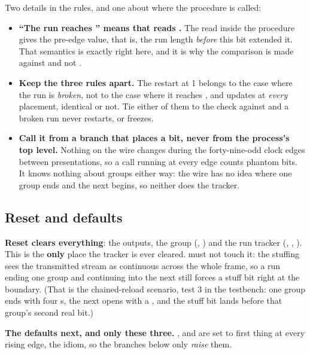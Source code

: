 Two details in the rules, and one about where the procedure is called:
\begin{itemize}
  \item \textbf{``The run reaches '' means that  reads
    .} The read inside the procedure gives the pre-edge value, that is, the run
    length \emph{before} this bit extended it. That semantics is exactly right here, and it is why
    the comparison is made against  and not .
  \item \textbf{Keep the three rules apart.} The restart at 1 belongs to the case where the run is
    \emph{broken}, not to the case where it reaches , and  updates at
    \emph{every} placement, identical or not. Tie either of them to the check against 
    and a broken run never restarts, or  freezes.
  \item \textbf{Call it from a branch that places a bit, never from the process's top level.} Nothing
    on the wire changes during the forty-nine-odd clock edges between presentations, so a call
    running at every edge counts phantom bits. It knows nothing about groups either way: the wire has
    no idea where one group ends and the next begins, so neither does the tracker.
\end{itemize}

\subsection{Reset and defaults}
\label{c14:sub:defaults}

\textbf{Reset clears everything}: the outputs, the group (, ) and the
run tracker (, , ). This is the \textbf{only}
place the tracker is ever cleared.  must not touch it: the stuffing sees the transmitted
stream as continuous across the whole frame, so a run ending one group and continuing into the next
still forces a stuff bit right at the boundary. (That is the chained-reload scenario, test 3 in the
testbench: one group ends with four s, the next opens with a , and the stuff bit
lands before that group's second real bit.)

\textbf{The defaults next, and only these three.} ,  and  are
set to  first thing at every rising edge, the  idiom, so the branches below
only \emph{raise} them.

